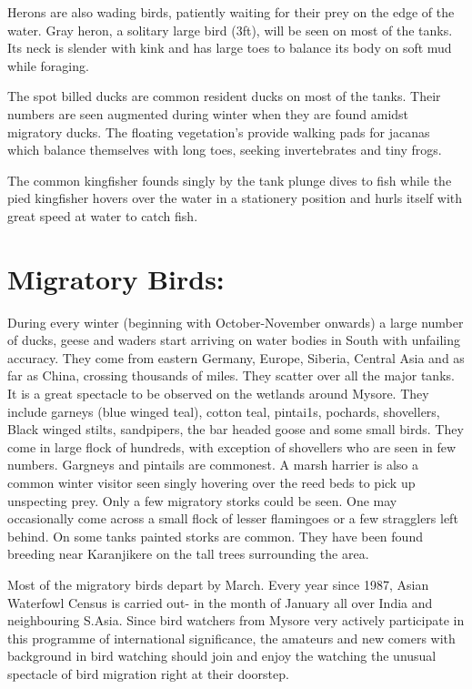 Herons are also wading birds, patiently waiting for 
their prey on the edge of the water. Gray heron, a 
solitary large bird (3ft), will be seen on most of the tanks. 
Its neck is slender with kink and has large toes to balance 
its body on soft mud while foraging. 

The spot billed ducks are common resident ducks on most 
of the tanks. Their numbers are seen augmented during winter 
when they are found amidst migratory ducks. The floating 
vegetation's provide walking pads for jacanas which balance 
themselves with long toes, seeking invertebrates and tiny 
frogs. 

The common kingfisher founds singly by the tank plunge 
dives to fish while the pied kingfisher hovers over the water 
in a stationery position and hurls itself with great speed at 
water to catch fish. 

\section*{Migratory Birds:} 

During every winter (beginning with October-November 
onwards) a large number of ducks, geese and waders start 
arriving on water bodies in South with unfailing accuracy. 
They come from eastern Germany, Europe, Siberia, Central Asia 
and as far as China, crossing thousands of miles. They 
scatter over all the major tanks. It is a great spectacle to 
be observed on the wetlands around Mysore. They include 
garneys (blue winged teal), cotton teal, pintai1s, 
pochards, shovellers, Black winged stilts, sandpipers, the 
bar headed goose and some small birds. They come in large 
flock of hundreds, with exception of shovellers who are seen 
in few numbers. Gargneys and pintails are commonest. A 
marsh harrier is also a common winter visitor seen singly 
hovering over the reed beds to pick up unspecting prey. Only 
a few migratory storks could be seen. One may occasionally 
come across a small flock of lesser flamingoes  or a few 
stragglers left behind. On some tanks painted storks are 
common. They have been found breeding near Karanjikere on the tall 
trees surrounding the area. 

Most of the migratory birds depart by March. Every year
since 1987, Asian Waterfowl Census is carried out- in the 
month of January all over India and neighbouring S.Asia. 
Since bird watchers from Mysore very actively participate in 
this programme of international significance, the amateurs 
and new comers with background in bird watching should join 
and enjoy the watching the unusual spectacle of bird 
migration right at their doorstep. 

